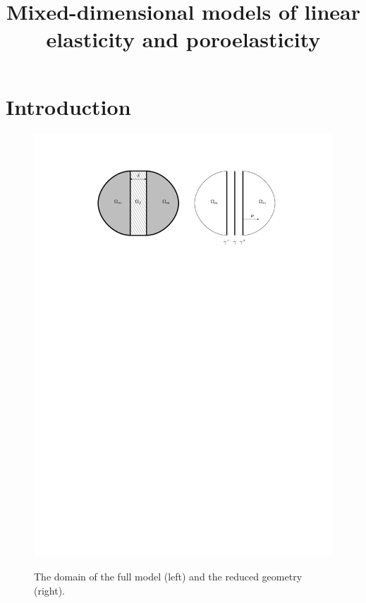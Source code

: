 \documentclass[a4paper]{article}
\begin{document}
\title{Mixed-dimensional models of linear elasticity and poroelasticity}
\maketitle

\section{Introduction}


\begin{figure}[h]
\centering
\includegraphics[width=\textwidth]{figures/omegas}
\label{fig:omegas}
\caption{The domain of the full model (left) and the reduced geometry (right).}
\end{figure}
\end{document}
